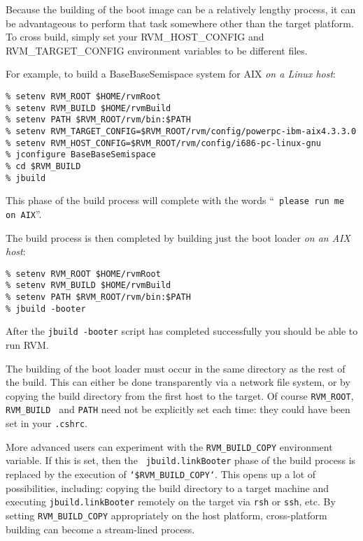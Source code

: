 Because the building of the boot image can be a relatively lengthy
process, it can be advantageous to perform that task somewhere other
than the target platform.  To cross build, simply set your
RVM\_HOST\_CONFIG and RVM\_TARGET\_CONFIG environment variables to
be different files.

For example, to build a BaseBaseSemispace system for AIX\AIXTMFootnote
{\em on a Linux host}:
\begin{verbatim}
% setenv RVM_ROOT $HOME/rvmRoot
% setenv RVM_BUILD $HOME/rvmBuild
% setenv PATH $RVM_ROOT/rvm/bin:$PATH
% setenv RVM_TARGET_CONFIG=$RVM_ROOT/rvm/config/powerpc-ibm-aix4.3.3.0
% setenv RVM_HOST_CONFIG=$RVM_ROOT/rvm/config/i686-pc-linux-gnu
% jconfigure BaseBaseSemispace
% cd $RVM_BUILD
% jbuild
\end{verbatim}

This phase of the build process will complete with the words ``{\tt
  please run me on AIX}''.


The build process is then completed by building just the boot loader {\em
  on an AIX host}:

\begin{verbatim}
% setenv RVM_ROOT $HOME/rvmRoot
% setenv RVM_BUILD $HOME/rvmBuild
% setenv PATH $RVM_ROOT/rvm/bin:$PATH
% jbuild -booter
\end{verbatim}

After the {\tt jbuild -booter} script has completed successfully you should be able 
to run RVM. 

The building of the boot loader must occur in the same directory as
the rest of the build.  This can either be done transparently via a
network file system, or by copying the build directory from the first
host to the target.  Of course {\tt RVM\_ROOT}, {\tt RVM\_BUILD }
and {\tt PATH} need not be explicitly set each time: they could have
been set in your {\tt .cshrc}.

More advanced users can experiment with the {\tt RVM\_BUILD\_COPY}
environment variable.  If this is set, then the {\tt
  jbuild.linkBooter} phase of the build process is replaced by the
execution of {\tt `\$RVM\_BUILD\_COPY`}.  This opens up a lot of
possibilities, including: copying the build directory to a target
machine and executing {\tt jbuild.linkBooter} remotely on the target
via {\tt rsh} or {\tt ssh}, etc.  By setting {\tt RVM\_BUILD\_COPY}
appropriately on the host platform, cross-platform building can become
a stream-lined process.

\JikesAIXTMFooter

